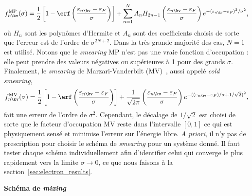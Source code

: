 \begin{equation}
    f_{n\kv}^\text{MP}(\sigma)=\frac{1}{2}\left[1-\erf\left(\frac{\varepsilon_{n\kv}-\varepsilon_F}{\sigma}\right)\right]+\sum_{n=1}^NA_nH_{2n-1}\left(\frac{\varepsilon_{n\kv}-\varepsilon_F}{\sigma}\right)e^{-(\varepsilon_{n\kv}-\varepsilon_F)^2/\sigma^2},
    \label{eqn:c2_smearing_MP}
\end{equation}
où $H_n$ sont les polynômes d'Hermite et $A_n$ sont des coefficients choisis de sorte que l'erreur est de l'ordre de $\sigma^{2N+2}$. Dans la très grande majorité des cas, $N=1$ est utilisé. Notons que le \textit{smearing} MP n'est pas une vraie fonction d'occupation : elle peut prendre des valeurs négatives ou supérieures à 1 pour des grands $\sigma$. Finalement, le \textit{smearing} de Marzari-Vanderbilt (MV)~\cite{marzariThermalContractionDisordering1999}, aussi appelé \textit{cold smearing},
\begin{equation}
    f_{n\kv}^{\text{MV}}(\sigma)=\frac{1}{2}\left[1-\erf\left(\frac{\varepsilon_{n\kv}-\varepsilon_F}{\sigma}\right)\right]+\frac{1}{\sqrt{2\pi}}\left(\frac{\varepsilon_{n\kv}-\varepsilon_F}{\sigma}\right)e^{-((\varepsilon_{n\kv}-\varepsilon_F)/\sigma+1/\sqrt{2})^2},
    \label{eqn:c2_smearing_MV}
\end{equation}
fait une erreur de l'ordre de $\sigma^2$. Cependant, le décalage de $1/\sqrt{2}$ est choisi de sorte que le facteur d'occupation MV reste dans l'intervalle $[0,1]$ ce qui est physiquement sensé et minimise l'erreur sur l'énergie libre. \textit{A priori}, il n'y pas de prescription pour choisir le schéma de \textit{smearing} pour un système donné. Il faut tester chaque schéma individuellement afin d'identifier celui 
qui converge le plus rapidement vers la limite $\sigma\to 0$, ce que 
nous faisons à la section~\ref{sec:electron_results}.

\noindent\textbf{Schéma de \textit{mixing}}

